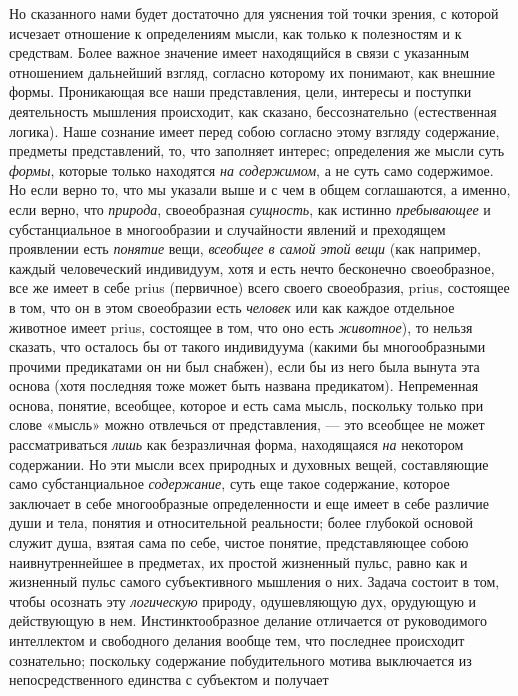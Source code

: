 Но сказанного нами будет достаточно для уяснения той точки зрения, с которой
исчезает отношение к определениям мысли, как только к полезностям и к
средствам. Более важное значение имеет находящийся в связи с указанным
отношением дальнейший взгляд, согласно которому их понимают, как внешние
формы. Проникающая все наши представления, цели, интересы и поступки
деятельность мышления происходит, как сказано, бессознательно (естественная
логика). Наше сознание имеет перед собою согласно этому взгляду содержание,
предметы представлений, то, что заполняет интерес; определения же мысли
суть {\em формы}, которые только находятся
{\em на содержимом}, а не суть само содержимое. Но если
верно то, что мы указали выше и с чем в общем соглашаются, а именно, если
верно, что {\em природа}, своеобразная
{\em сущность}, как истинно
{\em пребывающее} и субстанциальное в многообразии и
случайности явлений и преходящем проявлении есть
{\em понятие} вещи, {\em всеобщее в
самой этой }{\em вещи} (как например, каждый
человеческий индивидуум, хотя и есть нечто бесконечно своеобразное, все же
имеет в себе prius (первичное) всего своего своеобразия, prius, состоящее в
том, что он в этом своеобразии есть {\em человек} или
как каждое отдельное животное имеет prius, состоящее в том, что оно есть
{\em животное}), то нельзя сказать, что осталось бы от
такого индивидуума (какими бы многообразными прочими предикатами он ни был
снабжен), если бы из него была вынута эта основа (хотя последняя тоже может
быть названа предикатом). Непременная основа, понятие, всеобщее, которое и
есть сама мысль, поскольку только при слове «мысль» можно отвлечься от
представления, — это всеобщее не может рассматриваться
{\em лишь} как безразличная форма, находящаяся
{\em на} некотором содержании. Но эти мысли всех
природных и духовных вещей, составляющие само субстанциальное
{\em содержание}, суть еще такое содержание, которое
заключает в себе многообразные определенности и еще имеет в себе различие
души и тела, понятия и относительной реальности; более глубокой основой
служит душа, взятая сама по себе, чистое понятие, представляющее собою
наивнутреннейшее в предметах, их простой жизненный пульс, равно как и
жизненный пульс самого субъективного мышления о них. Задача состоит в том,
чтобы осознать эту {\em логическую} природу,
одушевляющую дух, орудующую и действующую в нем. Инстинктообразное делание
отличается от руководимого интеллектом и свободного делания вообще тем, что
последнее происходит сознательно; поскольку содержание побудительного
мотива выключается из непосредственного единства с субъектом и получает
